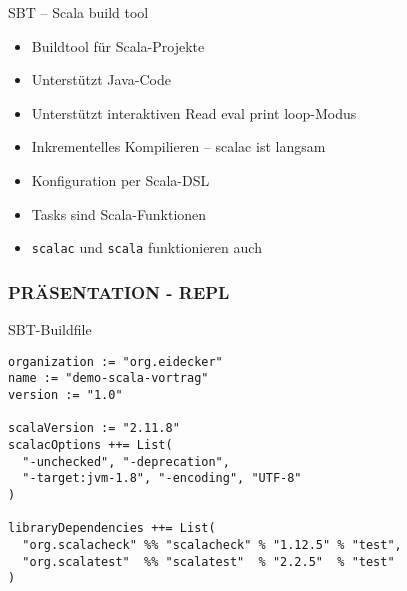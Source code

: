 \documentclass[14pt,aspectratio=169,trans]{beamer} %
\begin{document}
\begin{frame}{}
	\begin{block}{SBT -- Scala build tool}
		\begin{itemize}
			\item<2->Buildtool für Scala-Projekte
			\item<3->Unterstützt Java-Code
			\item<4->Unterstützt interaktiven Read eval print loop-Modus
			\item<5->Inkrementelles Kompilieren -- scalac ist langsam
			\item<6->Konfiguration per Scala-DSL
			\item<7->Tasks sind Scala-Funktionen
			\item<8->\texttt{scalac} und \texttt{scala} funktionieren auch
		\end{itemize}
	\end{block}
\end{frame}

\subsubsection*{PRÄSENTATION - REPL}


\begin{frame}[fragile]{}
	\begin{block}{SBT-Buildfile}
		\scriptsize
		\onslide<2->
  \begin{lstlisting}
organization := "org.eidecker"
name := "demo-scala-vortrag"
version := "1.0"

scalaVersion := "2.11.8"
scalacOptions ++= List(
  "-unchecked", "-deprecation",
  "-target:jvm-1.8", "-encoding", "UTF-8"
)

libraryDependencies ++= List(
  "org.scalacheck" %% "scalacheck" % "1.12.5" % "test",
  "org.scalatest"  %% "scalatest"  % "2.2.5"  % "test"
)
	\end{lstlisting}
	\end{block}
\end{frame}
\end{document}
